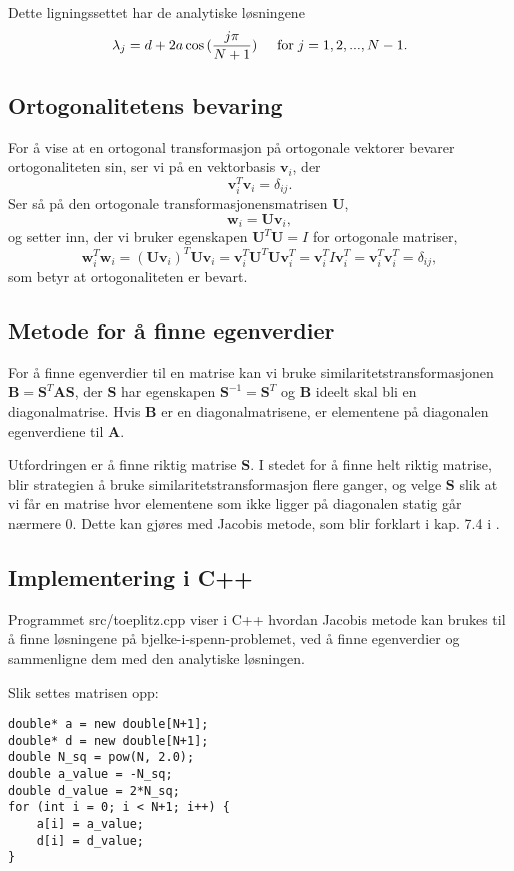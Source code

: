 \documentclass[a4paper,10pt,english]{article}
\begin{document}
Dette ligningssettet har de analytiske løsningene
$$\lambda_j = d+2a\cos{(\frac{j\pi}{N+1})} \hspace{0.5cm} \mathrm{for} \hspace{0.1cm} j=1,2,...,N-1.$$

\subsection*{Ortogonalitetens bevaring}
For å vise at en ortogonal transformasjon på ortogonale vektorer bevarer
ortogonaliteten sin, ser vi på en vektorbasis $\mathbf{v}_i$, der
$$\mathbf{v}_i^T \mathbf{v}_i = \delta_{i j} .$$
Ser så på den ortogonale transformasjonensmatrisen $\mathbf{U}$,
$$\mathbf{w}_i = \mathbf{U} \mathbf{v}_i ,$$
og setter inn, der vi bruker egenskapen $\mathbf{U}^T \mathbf{U} = I$ for ortogonale
matriser,
$$\mathbf{w}_i^T \mathbf{w}_i = (\mathbf{U} \mathbf{v}_i)^T \mathbf{U} \mathbf{v}_i = \mathbf{v}_i^T \mathbf{U}^T \mathbf{U} \mathbf{v}_i^T = \mathbf{v}_i^T I \mathbf{v}_i^T = \mathbf{v}_i^T \mathbf{v}_i^T = \delta_{i j},$$
som betyr at ortogonaliteten er bevart.

\subsection*{Metode for å finne egenverdier}
For å finne egenverdier til en matrise kan vi bruke similaritetstransformasjonen $\mathbf{B}=\mathbf{S}^T\mathbf{A}\mathbf{S}$, der $\mathbf{S}$ har egenskapen $\mathbf{S}^{-1}=\mathbf{S}^T$ og $\mathbf{B}$ ideelt skal bli en diagonalmatrise. Hvis $\mathbf{B}$ er en diagonalmatrisene, er elementene på diagonalen egenverdiene til $\mathbf{A}$.

Utfordringen er å finne riktig matrise $\mathbf{S}$. I stedet for å finne helt riktig matrise, blir strategien å bruke similaritetstransformasjon flere ganger, og velge $\mathbf{S}$ slik at vi får en matrise hvor elementene som ikke ligger på diagonalen statig går nærmere 0. Dette kan gjøres med Jacobis metode, som blir forklart i kap. 7.4 i \cite{komp}.

\subsection*{Implementering i C++}
Programmet src/toeplitz.cpp viser i C++ hvordan Jacobis metode kan brukes til å finne løsningene på bjelke-i-spenn-problemet, ved å finne egenverdier og sammenligne dem med den analytiske løsningen.

Slik settes matrisen opp:
\begin{lstlisting}
double* a = new double[N+1];
double* d = new double[N+1];
double N_sq = pow(N, 2.0);
double a_value = -N_sq;
double d_value = 2*N_sq;
for (int i = 0; i < N+1; i++) {
    a[i] = a_value;
    d[i] = d_value;
}
\end{lstlisting}
\end{document}
